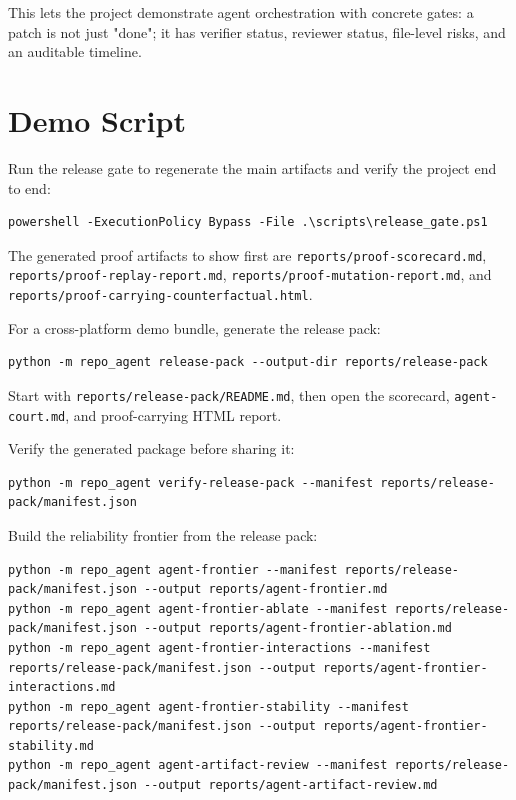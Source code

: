 \documentclass[UTF8,12pt,openany]{ctexbook}
\begin{document}
This lets the project demonstrate agent orchestration with concrete gates: a patch is not just "done"; it has verifier status, reviewer status, file-level risks, and an auditable timeline.\par

\section{Demo Script}

Run the release gate to regenerate the main artifacts and verify the project end to end:\par

\begin{lstlisting}
powershell -ExecutionPolicy Bypass -File .\scripts\release_gate.ps1
\end{lstlisting}

The generated proof artifacts to show first are \texttt{reports/proof-scorecard.md}, \texttt{reports/proof-replay-report.md}, \texttt{reports/proof-mutation-report.md}, and \texttt{reports/proof-carrying-counterfactual.html}.\par

For a cross-platform demo bundle, generate the release pack:\par

\begin{lstlisting}
python -m repo_agent release-pack --output-dir reports/release-pack
\end{lstlisting}

Start with \texttt{reports/release-pack/README.md}, then open the scorecard, \texttt{agent-court.md}, and proof-carrying HTML report.\par

Verify the generated package before sharing it:\par

\begin{lstlisting}
python -m repo_agent verify-release-pack --manifest reports/release-pack/manifest.json
\end{lstlisting}

Build the reliability frontier from the release pack:\par

\begin{lstlisting}
python -m repo_agent agent-frontier --manifest reports/release-pack/manifest.json --output reports/agent-frontier.md
python -m repo_agent agent-frontier-ablate --manifest reports/release-pack/manifest.json --output reports/agent-frontier-ablation.md
python -m repo_agent agent-frontier-interactions --manifest reports/release-pack/manifest.json --output reports/agent-frontier-interactions.md
python -m repo_agent agent-frontier-stability --manifest reports/release-pack/manifest.json --output reports/agent-frontier-stability.md
python -m repo_agent agent-artifact-review --manifest reports/release-pack/manifest.json --output reports/agent-artifact-review.md
\end{lstlisting}
\end{document}
